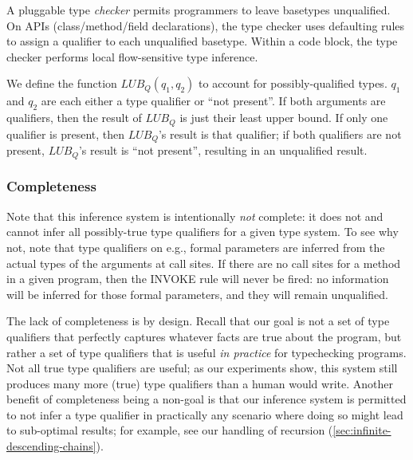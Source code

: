 A pluggable type \emph{checker} permits programmers to leave basetypes unqualified.
On APIs (class/method/field declarations), the type checker uses defaulting
rules to assign a qualifier to each unqualified basetype.
Within a code block, the type checker performs local flow-sensitive type
inference.

We define the function $\mathit{LUB_Q}(q_1, q_2)$ to account for possibly-qualified types.
$q_1$ and $q_2$ are each either a type qualifier or ``not present''.
If both arguments are qualifiers, then the result of $\mathit{LUB_Q}$
is just their least upper bound. If only one qualifier is present, then $\mathit{LUB_Q}$'s result
is that qualifier; if both qualifiers are not present, $\mathit{LUB_Q}$'s result is ``not present'',
resulting in an unqualified result.


\subsubsection{Completeness}
\label{sec:complete}

Note that this inference system is intentionally \emph{not} complete: it
does not and cannot infer all possibly-true type qualifiers for a given type
system. To see why not, note that type qualifiers on e.g., formal parameters
are inferred from the actual types of the arguments at call sites. If there
are no call sites for a method in a given program, then the \textsc{INVOKE}
rule will never be fired: no information will be inferred for those formal
parameters, and they will remain unqualified.

The lack of completeness is by design. Recall that our goal is not a
set of type qualifiers that perfectly captures whatever facts are true
about the program, but rather a set of type qualifiers that is useful
\emph{in practice} for typechecking programs. Not all true type qualifiers
are useful; as our experiments show, this system still produces many more
(true) type qualifiers than a human would write.  Another benefit of completeness being a non-goal
is that our inference system is permitted to not infer a type qualifier
in practically any scenario where doing so might lead to sub-optimal results;
for example, see our handling of recursion (\cref{sec:infinite-descending-chains}).

